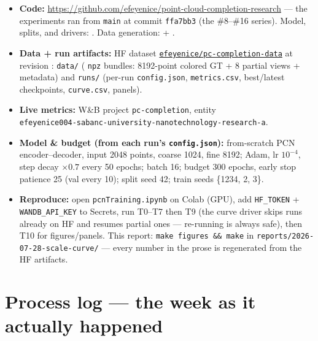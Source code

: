 \documentclass[11pt]{article}
\begin{document}
\begin{itemize}
  \item \textbf{Code:} \url{https://github.com/efeyenice/point-cloud-completion-research}
  --- the experiments ran from \texttt{main} at commit \texttt{ffa7bb3} (the \#8--\#16
  series). Model, splits, and drivers: . Data
  generation:  + .
  \item \textbf{Data + run artifacts:} HF dataset
  \href{https://huggingface.co/datasets/efeyenice/pc-completion-data}{\texttt{efeyenice/pc-completion-data}}
  at revision \texttt{\datasetRev}: \texttt{data/} (\nBundles{} \texttt{npz} bundles:
  8192-point colored GT + 8 partial views + metadata) and \texttt{runs/} (per-run
  \texttt{config.json}, \texttt{metrics.csv}, best/latest checkpoints,
  \texttt{curve.csv}, panels).
  \item \textbf{Live metrics:} W\&B project \texttt{pc-completion}, entity\\
  \texttt{efeyenice004-sabanc-university-nanotechnology-research-a}.
  \item \textbf{Model \& budget (from each run's \texttt{config.json}):} from-scratch PCN
  encoder--decoder, input 2048 points, coarse 1024, fine 8192; Adam, lr $10^{-4}$, step
  decay $\times 0.7$ every 50 epochs; batch 16; budget 300 epochs, early stop patience
  25 (val every 10); split seed 42; train seeds \{1234, 2, 3\}.
  \item \textbf{Reproduce:} open \texttt{pcnTraining.ipynb} on Colab (GPU), add
  \texttt{HF\_TOKEN} + \texttt{WANDB\_API\_KEY} to Secrets, run T0--T7 then T9 (the curve
  driver skips runs already on HF and resumes partial ones --- re-running is always
  safe), then T10 for figures/panels. This report:
  \texttt{make figures \&\& make} in \texttt{reports/2026-07-28-scale-curve/} --- every
  number in the prose is regenerated from the HF artifacts.
\end{itemize}

\section{Process log --- the week as it actually happened}\label{app:process}
\end{document}
